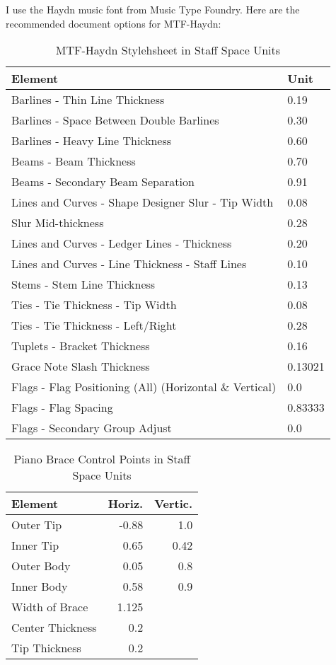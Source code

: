 \documentclass[]{memoir}
\begin{document}
I use the Haydn music font from Music Type Foundry. Here are the recommended document options for MTF-Haydn:
\begin{table}[h!]
  \begin{tabularx}{1.0\linewidth}{l l}
    Element & Unit \\\hline
    Barlines - Thin Line Thickness & 0.19\\
    Barlines - Space Between Double Barlines & 0.30\\
    Barlines - Heavy Line Thickness & 0.60\\
    Beams - Beam Thickness & 0.70\\
    Beams - Secondary Beam Separation & 0.91\\
    Lines and Curves - Shape Designer Slur - Tip Width & 0.08\\
    Slur Mid-thickness & 0.28\\
    Lines and Curves - Ledger Lines - Thickness & 0.20\\
    Lines and Curves - Line Thickness - Staff Lines & 0.10\\
    Stems - Stem Line Thickness & 0.13\\
    Ties - Tie Thickness - Tip Width & 0.08\\
    Ties - Tie Thickness - Left/Right & 0.28\\
    Tuplets - Bracket Thickness & 0.16\\
    Grace Note Slash Thickness & 0.13021\\
    Flags - Flag Positioning (All) (Horizontal \& Vertical) & 0.0\\
    Flags - Flag Spacing & 0.83333\\
    Flags - Secondary Group Adjust & 0.0\\
  \end{tabularx}
  \caption{MTF-Haydn Stylehsheet in Staff Space Units}
\end{table}
\begin{table}[h!]
  \begin{tabularx}{1.0\linewidth}{l r r}
    Element & Horiz. & Vertic.\\\hline
    Outer Tip & -0.88 & 1.0\\
    Inner Tip & 0.65 & 0.42\\
    Outer Body & 0.05 & 0.8\\
    Inner Body & 0.58 & 0.9\\
    Width of Brace & 1.125 &\\
    Center Thickness & 0.2 &\\
    Tip Thickness & 0.2 &\\
    
  \end{tabularx}
  \caption{Piano Brace Control Points in Staff Space Units}
\end{table}
\end{document}
